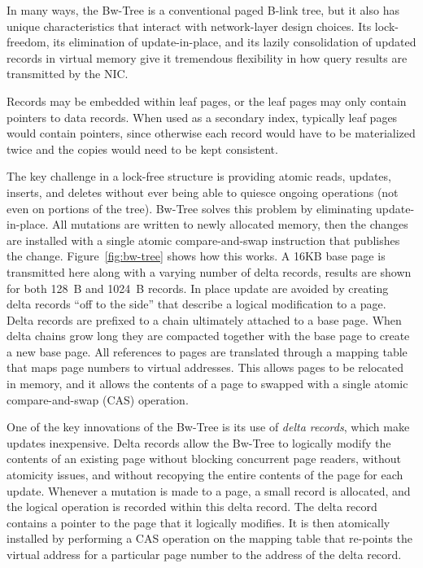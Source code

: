 In many ways, the Bw-Tree is a conventional paged B-link tree,
but it also has unique characteristics that interact with network-layer
design choices. Its lock-freedom, its elimination of update-in-place,
and its lazily consolidation of updated records in virtual memory give it
tremendous flexibility in how query results are transmitted by the NIC.

Records may be embedded within leaf pages, or the leaf pages may
only contain pointers to data records. When used as a secondary index,
typically leaf pages would contain pointers, since otherwise each record would
have to be materialized twice and the copies would need to be kept consistent.


The key challenge in a lock-free structure is providing atomic reads, updates,
inserts, and deletes without ever being able to quiesce ongoing operations (not
even on portions of the tree). Bw-Tree solves this problem by eliminating
update-in-place. All mutations are written to newly allocated memory, then
the changes are installed with a single atomic compare-and-swap instruction
that publishes the change.  Figure~\ref{fig:bw-tree} shows how this works.
A 16KB base page is transmitted here along with a varying number of delta records,
results are shown for both 128~B and 1024~B records.
In place update are avoided by creating delta records ``off to the side'' 
that describe a logical modification to a page. Delta records are
prefixed to a chain ultimately attached to a base page.  When delta chains
grow long they are compacted together with the base page to create a new base page.
All references to pages are translated through a mapping table that maps page
numbers to virtual addresses. This allows pages to be relocated in memory, and
it allows the contents of a page to swapped with a single atomic
compare-and-swap (CAS) operation.

One of the key innovations of the Bw-Tree is its use of {\em delta records},
which make updates inexpensive.
Delta records allow the Bw-Tree to logically modify the
contents of an existing page without blocking concurrent page readers, without
atomicity issues, and without recopying the entire contents of the page for
each update.  Whenever a mutation is made to a page, a small record is
allocated, and the logical operation is recorded within this delta record. The delta
record contains a pointer to the page that it logically modifies. It
is then atomically installed by performing a CAS operation on the
mapping table that re-points the virtual address for a particular page number
to the address of the delta record.


